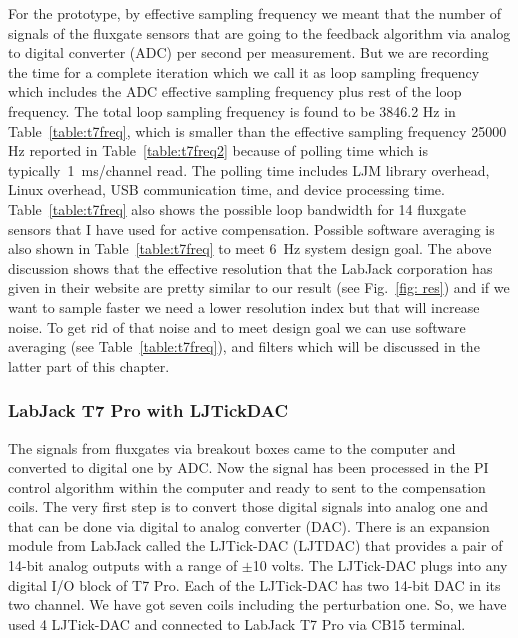 For the prototype, by effective sampling frequency we meant that the number of signals of the fluxgate sensors that are going to the feedback algorithm via analog to digital converter (ADC) per second per measurement. But we are recording the time for a complete iteration which we call it as loop sampling frequency which includes the ADC effective sampling frequency plus rest of the loop frequency. The total loop sampling frequency is found to be 3846.2 Hz in Table~\ref{table:t7freq}, which is smaller than the effective sampling frequency 25000 Hz reported in Table~\ref{table:t7freq2} because of polling time which is typically~1~ms/channel read. The polling time includes LJM library overhead, Linux overhead, USB communication time, and device processing time. Table~\ref{table:t7freq} also shows the possible loop bandwidth for 14 fluxgate sensors that I have used for active compensation. Possible software averaging is also shown in Table~\ref{table:t7freq} to meet 6~Hz system design goal.
The above discussion shows that the effective resolution that the LabJack corporation has given in their website are pretty similar to our result (see Fig.~\ref{fig: res}) and if we want to sample faster we need a lower resolution index but that will increase noise. To get rid of that noise and to meet design goal we can use software averaging (see Table~\ref{table:t7freq}), and filters which will be discussed in the latter part of this chapter.

\subsubsection{LabJack T7 Pro with LJTickDAC}
The signals from fluxgates via breakout boxes came to the computer and converted to digital one by ADC. Now the signal has been processed in the PI control algorithm within the computer and ready to sent to the compensation coils. The very first step is to convert those digital signals into analog one and that can be done via digital to analog converter (DAC). There is an expansion module from LabJack called the LJTick-DAC (LJTDAC) that provides a pair of 14-bit analog outputs with a range of $\pm$10 volts. The LJTick-DAC plugs into any digital I/O block of T7 Pro. Each of the LJTick-DAC has two 14-bit DAC in its two channel. We have got seven coils including the perturbation one. So, we have used 4 LJTick-DAC and connected to LabJack T7 Pro via CB15 terminal. 



